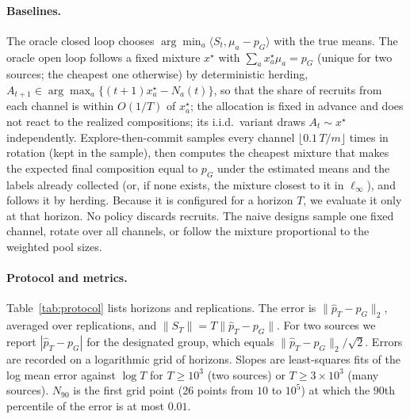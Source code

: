 \documentclass[twoside]{article}
\begin{document}
\paragraph{Baselines.} The oracle closed loop chooses
\(\arg\min_a\langle S_t,\mu_a-p_G\rangle\) with the true means. The
oracle open loop follows a fixed mixture \(x^\star\) with
\(\sum_ax^\star_a\mu_a=p_G\) (unique for two sources; the cheapest one
otherwise) by deterministic herding,
\(A_{t+1}\in\arg\max_a\{(t+1)x^\star_a-N_a(t)\}\), so that the share of
recruits from each channel is within \(O(1/T)\) of \(x^\star_a\); the
allocation is fixed in advance and does not react to the realized
compositions; its i.i.d.\ variant
draws \(A_t\sim x^\star\) independently. Explore-then-commit samples every
channel \(\lfloor0.1\,T/m\rfloor\) times in rotation (kept in the sample),
then computes the cheapest mixture that makes the expected final
composition equal to \(p_G\) under the estimated means and the labels
already collected (or, if none exists, the mixture closest to it in
\(\ell_\infty\)), and follows it by herding. Because it is configured for
a horizon \(T\), we evaluate it only at that horizon. No policy discards
recruits. The naive designs sample one fixed channel, rotate over 
all channels, or follow the mixture proportional to the weighted pool
sizes.

\paragraph{Protocol and metrics.} Table~\ref{tab:protocol} lists
horizons and replications. The error is \(\|\widehat p_T-p_G\|_2\),
averaged over replications, and \(\|S_T\|=T\|\widehat p_T-p_G\|\). For
two sources we report \(|\widehat p_T-p_G|\) for the designated group,
which equals \(\|\widehat p_T-p_G\|_2/\sqrt2\). Errors are recorded on a
logarithmic grid of horizons. Slopes are least-squares fits of the log mean
error against \(\log T\) for \(T\ge10^3\) (two sources) or
\(T\ge3\times10^3\) (many sources). \(N_{90}\) is the first grid point
(26 points from \(10\) to \(10^5\)) at which the \(90\)th percentile of the
error is at most \(0.01\).
\end{document}
